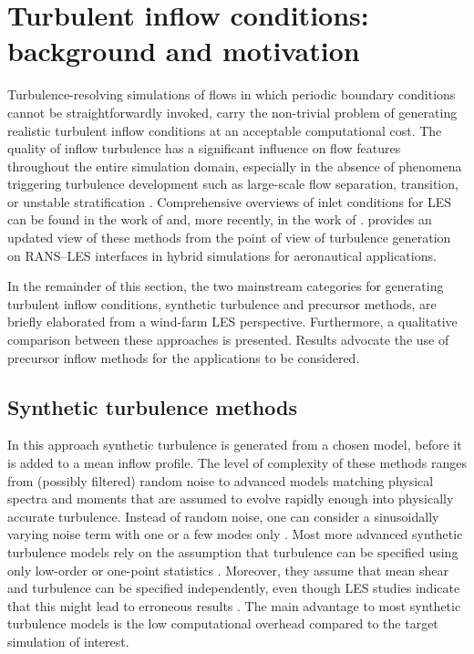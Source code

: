 \section{Turbulent inflow conditions: background and motivation}\label{sec:inflow_intro}

	Turbulence-resolving simulations of flows in which periodic boundary conditions cannot be straightforwardly invoked, carry the non-trivial problem of generating realistic turbulent inflow conditions at an acceptable computational cost. The quality of inflow turbulence has a significant influence on flow features throughout the entire simulation domain, especially in the absence of phenomena triggering turbulence development such as large-scale flow separation, transition, or unstable stratification \citep{keylock2011method}. Comprehensive overviews of inlet conditions for LES can be found in the work of \cite{keating2004priori} and, more recently, in the work of \cite{tabor2010inlet}. \cite{shur2014synthetic} provides an updated view of these methods from the point of view of turbulence generation on RANS--LES interfaces in hybrid simulations for aeronautical applications.
	
	In the remainder of this section, the two mainstream categories for generating turbulent inflow conditions, synthetic turbulence and precursor methods, are briefly elaborated from a wind-farm LES perspective. Furthermore, a qualitative comparison between these approaches is presented. Results advocate the use of precursor inflow methods for the applications to be considered.

	\subsection{Synthetic turbulence methods}
	In this approach synthetic turbulence is generated from a chosen model, before it is added to a mean inflow profile. The level of complexity of these methods ranges from (possibly filtered) random noise \cite[see, e.g.,][]{klein2003digital,munoz2015stochastic} to advanced models matching physical spectra and moments that are assumed to evolve rapidly enough  into physically accurate turbulence. Instead of random noise, one can consider a sinusoidally varying noise term with one or a few modes only \citep{mirocha2014resolved}. Most more advanced synthetic turbulence models rely on the assumption that turbulence can be specified using only low-order or one-point statistics \citep{keating2004priori}. Moreover, they assume that mean shear and turbulence can be specified independently, even though LES studies indicate that this might lead to erroneous results \citep{park2014large,mehta2014large}. The main advantage to most synthetic turbulence models is the low computational overhead compared to the target simulation of interest.
	

